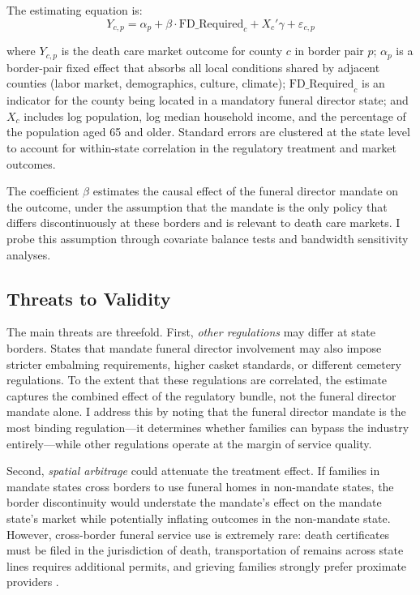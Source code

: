 \documentclass[12pt]{article}
\begin{document}
The estimating equation is:
\begin{equation}
Y_{c,p} = \alpha_p + \beta \cdot \text{FD\_Required}_c + X_c'\gamma + \varepsilon_{c,p}
\label{eq:main}
\end{equation}

\noindent where $Y_{c,p}$ is the death care market outcome for county $c$ in border pair $p$; $\alpha_p$ is a border-pair fixed effect that absorbs all local conditions shared by adjacent counties (labor market, demographics, culture, climate); $\text{FD\_Required}_c$ is an indicator for the county being located in a mandatory funeral director state; and $X_c$ includes log population, log median household income, and the percentage of the population aged 65 and older. Standard errors are clustered at the state level to account for within-state correlation in the regulatory treatment and market outcomes.

The coefficient $\beta$ estimates the causal effect of the funeral director mandate on the outcome, under the assumption that the mandate is the only policy that differs discontinuously at these borders and is relevant to death care markets. I probe this assumption through covariate balance tests and bandwidth sensitivity analyses.

\subsection{Threats to Validity}

The main threats are threefold. First, \textit{other regulations} may differ at state borders. States that mandate funeral director involvement may also impose stricter embalming requirements, higher casket standards, or different cemetery regulations. To the extent that these regulations are correlated, the estimate captures the combined effect of the regulatory bundle, not the funeral director mandate alone. I address this by noting that the funeral director mandate is the most binding regulation---it determines whether families can bypass the industry entirely---while other regulations operate at the margin of service quality.

Second, \textit{spatial arbitrage} could attenuate the treatment effect. If families in mandate states cross borders to use funeral homes in non-mandate states, the border discontinuity would understate the mandate's effect on the mandate state's market while potentially inflating outcomes in the non-mandate state. However, cross-border funeral service use is extremely rare: death certificates must be filed in the jurisdiction of death, transportation of remains across state lines requires additional permits, and grieving families strongly prefer proximate providers \citep{nfda2023statistics}.
\end{document}
